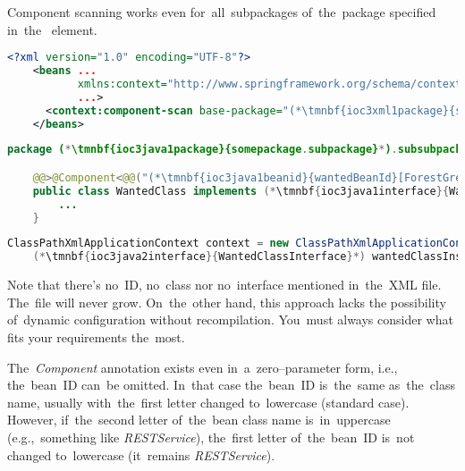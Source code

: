 Component scanning works even for~all~subpackages of~the~package specified in~the~ element.
\newpage

\begin{lstlisting}[language=XML, title={Configuration XML}]
    <?xml version="1.0" encoding="UTF-8"?>
    <beans ...
           xmlns:context="http://www.springframework.org/schema/context"
           ...>
      <context:component-scan base-package="(*\tmnbf{ioc3xml1package}{somepackage.subpackage}[ForestGreen]*)"/>
    </beans>
\end{lstlisting}
\begin{lstlisting}[language=Java, title={Wanted class}]
    package (*\tmnbf{ioc3java1package}{somepackage.subpackage}*).subsubpackage;

    @@>@Component<@@("(*\tmnbf{ioc3java1beanid}{wantedBeanId}[ForestGreen]*)")
    public class WantedClass implements (*\tmnbf{ioc3java1interface}{WantedClassInterface}*) {
        ...
    }
\end{lstlisting}
\begin{lstlisting}[language=Java, title={Usage}]
    ClassPathXmlApplicationContext context = new ClassPathXmlApplicationContext("configurationFile.xml");
    (*\tmnbf{ioc3java2interface}{WantedClassInterface}*) wantedClassInstance = context.getBean("(*\tmnbf{ioc3java2beanid}{wantedBeanId}[ForestGreen]*)", (*\tmnbf{ioc3java2interface2}{WantedClassInterface}*).class);
\end{lstlisting}

\noindent Note that there's no~ID, no~class nor no~interface mentioned in~the~XML file.
The~file will never grow.
On~the~other hand, this approach  lacks the possibility of~dynamic configuration without recompilation.
You~must always consider what fits your requirements the~most.

The~\textit{Component} annotation exists even in~a~zero--parameter form, i.e., the~bean~ID can~be omitted.
In~that case the~bean~ID is~the~same as~the~class name, usually with~the~first letter changed to~lowercase (standard case).
However, if~the~second letter of~the~bean class name is~in~uppercase (e.g.,~something like \textit{\mbox{RESTService}}), the~first letter of~the~bean~ID is~not changed to~lowercase (it~remains \textit{\mbox{RESTService}}).
\newpage

